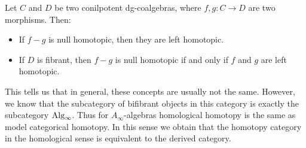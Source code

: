 \documentclass[../thesis.tex]{subfiles}
\begin{document}
    \begin{proposition}
        Let $C$ and $D$ be two conilpotent dg-coalgebras, where $f,g : C \rightarrow D$ are two morphisms. Then:
        \begin{itemize}
            \item If $f-g$ is null homotopic, then they are left homotopic.
            \item If $D$ is fibrant, then $f-g$ is null homotopic if and only if $f$ and $g$ are left homotopic.
        \end{itemize}
    \end{proposition}
    
    This tells us that in general, these concepts are usually not the same. However, we know that the subcategory of bifibrant objects in this category is exactly the subcategory $\tt{Alg}_\infty$. Thus for $A_\infty$-algebras homological homotopy is the same as model categorical homotopy. In this sense we obtain that the homotopy category in the homological sense is equivalent to the derived category.
\end{document}
